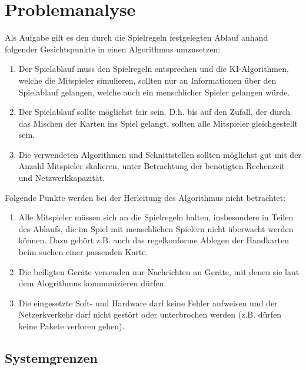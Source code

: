 \section{Problemanalyse}   %


Als Aufgabe gilt es den durch die Spielregeln festgelegten Ablauf anhand folgender Gesichtspunkte in einen Algorithmus umzusetzen:

\begin{enumerate}
	\item Der Spielablauf muss den Spielregeln entsprechen und die KI-Algorithmen, welche die Mitspieler simulieren, sollten nur an Informationen über den Spielablauf gelangen, welche auch ein menschlicher Spieler gelangen würde.
	\item Der Spielablauf sollte möglichst fair sein. D.h. bis auf den Zufall, der durch das Mischen der Karten ins Spiel gelangt, sollten alle Mitspieler gleichgestellt sein.
	\item Die verwendeten Algorithmen und Schnittstellen sollten möglichst gut mit der Anzahl Mitspieler skalieren, unter Betrachtung der benötigten Rechenzeit und Netzwerkkapazität.
\end{enumerate}

Folgende Punkte werden bei der Herleitung des Algorithmus nicht betrachtet:

\begin{enumerate}
	\item Alle Mitspieler müssen sich an die Spielregeln halten, insbesondere in Teilen des Ablaufs, die im Spiel mit menschlichen Spielern nicht überwacht werden können. Dazu gehört z.B. auch das regelkonforme Ablegen der Handkarten beim suchen einer passenden Karte.
	\item Die beiligten Geräte versenden nur Nachrichten an Geräte, mit denen sie laut dem Alogrithmus kommunizieren dürfen.
	\item Die eingesetzte Soft- und Hardware darf keine Fehler aufweisen und der Netzerkverkehr darf nicht gestört oder unterbrochen werden (z.B. dürfen keine Pakete verloren gehen).
\end{enumerate}


\subsection{Systemgrenzen}

